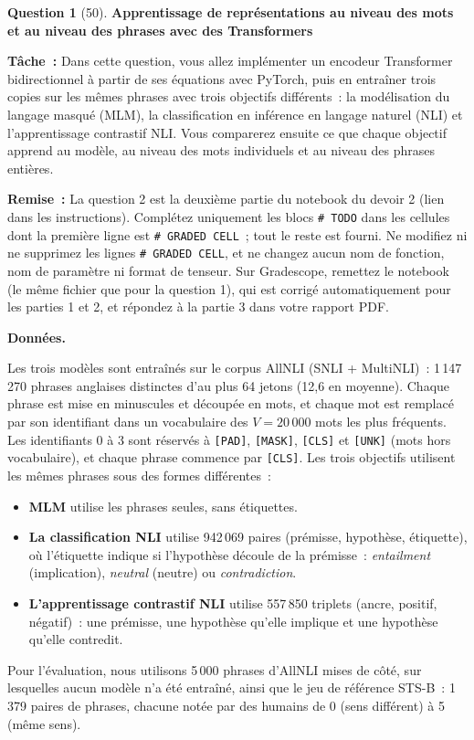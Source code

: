 \documentclass[12pt]{article}
\newif\ifexercise
\theoremstyle{definition}
\newtheorem{exercise}{Question}%
\newcommand{\Exercise}[1]{
\ifexercise#1\fi
}
\newif\ifexercise
\begin{document}
\begin{exercise}[50] \textbf{Apprentissage de représentations au niveau des mots et au niveau des phrases avec des Transformers}
\Exercise{\label{ex:transformer}}
\sloppy

\textbf{Tâche~:} Dans cette question, vous allez implémenter un encodeur Transformer bidirectionnel à partir de ses
équations avec PyTorch, puis en entraîner trois copies sur les mêmes phrases avec trois objectifs différents~: la
modélisation du langage masqué (MLM), la classification en inférence en langage naturel (NLI) et l'apprentissage
contrastif NLI. Vous comparerez ensuite ce que chaque objectif apprend au modèle, au niveau des mots individuels et
au niveau des phrases entières.

\textbf{Remise~:} La question 2 est la deuxième partie du notebook du devoir 2 (lien dans les instructions).
Complétez uniquement les blocs \texttt{\# TODO} dans les cellules dont la première ligne est
\texttt{\# GRADED CELL}~; tout le reste est fourni. Ne modifiez ni ne supprimez les lignes \texttt{\# GRADED CELL}, et
ne changez aucun nom de fonction, nom de paramètre ni format de tenseur. Sur Gradescope, remettez le notebook
(le même fichier que pour la question 1), qui est corrigé automatiquement pour les parties 1 et 2, et répondez à la
partie 3 dans votre rapport PDF.

\textbf{Données.}

Les trois modèles sont entraînés sur le corpus AllNLI (SNLI + MultiNLI)~: 1\,147\,270 phrases anglaises distinctes
d'au plus 64 jetons (12{,}6 en moyenne). Chaque phrase est mise en minuscules et découpée en mots, et chaque mot est
remplacé par son identifiant dans un vocabulaire des $V = 20\,000$ mots les plus fréquents. Les identifiants 0 à 3
sont réservés à \texttt{[PAD]}, \texttt{[MASK]}, \texttt{[CLS]} et \texttt{[UNK]} (mots hors vocabulaire), et chaque
phrase commence par \texttt{[CLS]}. Les trois objectifs utilisent les mêmes phrases sous des formes différentes~:
\begin{itemize}
  \item \textbf{MLM} utilise les phrases seules, sans étiquettes.
  \item \textbf{La classification NLI} utilise 942\,069 paires (prémisse, hypothèse, étiquette), où l'étiquette indique
        si l'hypothèse découle de la prémisse~: \emph{entailment} (implication), \emph{neutral} (neutre) ou
        \emph{contradiction}.
  \item \textbf{L'apprentissage contrastif NLI} utilise 557\,850 triplets (ancre, positif, négatif)~: une prémisse,
        une hypothèse qu'elle implique et une hypothèse qu'elle contredit.
\end{itemize}
Pour l'évaluation, nous utilisons 5\,000 phrases d'AllNLI mises de côté, sur lesquelles aucun modèle n'a été
entraîné, ainsi que le jeu de référence STS-B~: 1\,379 paires de phrases, chacune notée par des humains de 0 (sens
différent) à 5 (même sens).


\end{exercise}
\end{document}
